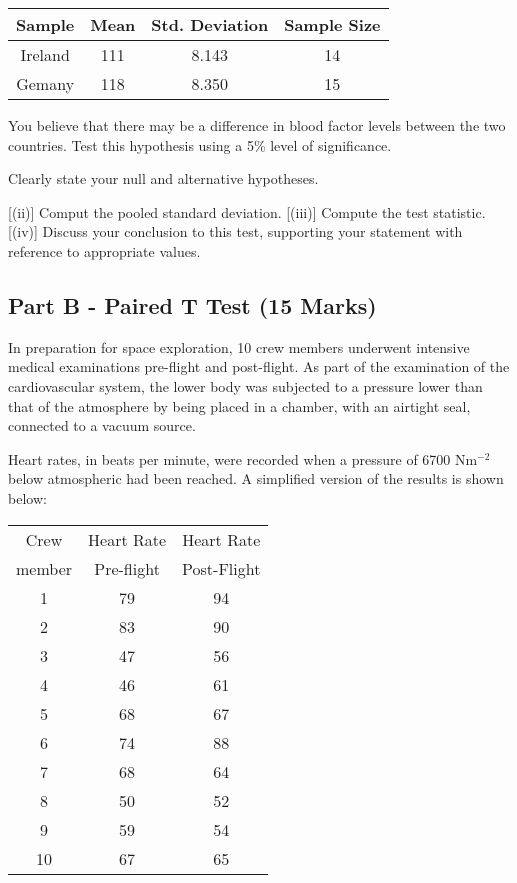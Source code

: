 		\begin{center}	
	\begin{tabular}{|c|c|c|c|} \hline 
		Sample & Mean & Std. Deviation & Sample Size \\  \hline 
		Ireland & 111 & 8.143 & 14 \\ \hline 
		Gemany & 118 & 8.350 & 15 \\ \hline
		\end{tabular} 
				\end{center}
You believe that there may be a difference in blood factor levels between the two countries. Test this hypothesis using a 5\% level of significance. 
\begin{itemize}
[(i)] Clearly state your null and alternative hypotheses.

[(ii)]  Comput the pooled standard deviation.
[(iii)] Compute the test statistic.
[(iv)] Discuss your conclusion to this test, supporting your statement with reference to appropriate values.
\end{itemize}				

\subsection*{Part B - Paired T Test (15 Marks)}
In preparation for space exploration, 10 crew members underwent intensive
 medical examinations pre-flight and post-flight. As part of the examination
 of the cardiovascular system, the lower body was subjected to a pressure lower
 than that of the atmosphere by being placed in a chamber, with an airtight
 seal, connected to a vacuum source. \\ \smallskip
 
\noindent Heart rates, in beats per minute, were
 recorded when a pressure of 6700 Nm$^{−2}$ below atmospheric had been reached.
 A simplified version of the results is shown below:
		\begin{center}
			
		
			\begin{tabular}{|c|c|c|} \hline 
	Crew   & Heart Rate & Heart Rate \\
\phantom{spa}	member \phantom{spa}& \phantom{spa}Pre-flight\phantom{spa} & \phantom{spa}Post-Flight \phantom{spa}\\	\hline \hline
		1 & 79 & 94 \\ \hline
		2 & 83 & 90 \\ \hline
		3 & 47 & 56 \\ \hline 
		4 & 46 & 61 \\ \hline
		5 & 68 & 67 \\ \hline 
		6 & 74 & 88 \\ \hline
		7 & 68 & 64 \\ \hline 
		8 & 50 & 52 \\ \hline 
		9 & 59 & 54 \\ \hline 
		10 & 67 & 65 \\ \hline
			\end{tabular} 
		\end{center}


